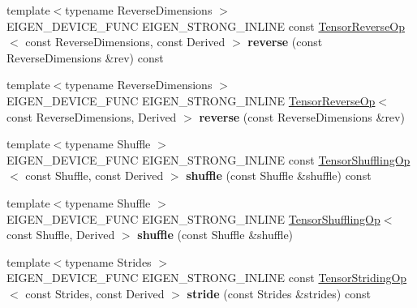 \begin{DoxyCompactItemize}
\item 
\mbox{\label{class_eigen_1_1_tensor_base_a5750e1b817c004898c1b54101c84e419}} 
{\footnotesize template$<$typename Reverse\+Dimensions $>$ }\\E\+I\+G\+E\+N\+\_\+\+D\+E\+V\+I\+C\+E\+\_\+\+F\+U\+NC E\+I\+G\+E\+N\+\_\+\+S\+T\+R\+O\+N\+G\+\_\+\+I\+N\+L\+I\+NE const \hyperlink{class_eigen_1_1_tensor_reverse_op}{Tensor\+Reverse\+Op}$<$ const Reverse\+Dimensions, const Derived $>$ {\bfseries reverse} (const Reverse\+Dimensions \&rev) const
\item 
\mbox{\label{class_eigen_1_1_tensor_base_af728216c82e1b396c5c1f22855733368}} 
{\footnotesize template$<$typename Reverse\+Dimensions $>$ }\\E\+I\+G\+E\+N\+\_\+\+D\+E\+V\+I\+C\+E\+\_\+\+F\+U\+NC E\+I\+G\+E\+N\+\_\+\+S\+T\+R\+O\+N\+G\+\_\+\+I\+N\+L\+I\+NE \hyperlink{class_eigen_1_1_tensor_reverse_op}{Tensor\+Reverse\+Op}$<$ const Reverse\+Dimensions, Derived $>$ {\bfseries reverse} (const Reverse\+Dimensions \&rev)
\item 
\mbox{\label{class_eigen_1_1_tensor_base_a8d6f38be695d3f72a6106463c10fc50e}} 
{\footnotesize template$<$typename Shuffle $>$ }\\E\+I\+G\+E\+N\+\_\+\+D\+E\+V\+I\+C\+E\+\_\+\+F\+U\+NC E\+I\+G\+E\+N\+\_\+\+S\+T\+R\+O\+N\+G\+\_\+\+I\+N\+L\+I\+NE const \hyperlink{class_eigen_1_1_tensor_shuffling_op}{Tensor\+Shuffling\+Op}$<$ const Shuffle, const Derived $>$ {\bfseries shuffle} (const Shuffle \&shuffle) const
\item 
\mbox{\label{class_eigen_1_1_tensor_base_aabecda1dcfdfd4d699f2fc174b7619a6}} 
{\footnotesize template$<$typename Shuffle $>$ }\\E\+I\+G\+E\+N\+\_\+\+D\+E\+V\+I\+C\+E\+\_\+\+F\+U\+NC E\+I\+G\+E\+N\+\_\+\+S\+T\+R\+O\+N\+G\+\_\+\+I\+N\+L\+I\+NE \hyperlink{class_eigen_1_1_tensor_shuffling_op}{Tensor\+Shuffling\+Op}$<$ const Shuffle, Derived $>$ {\bfseries shuffle} (const Shuffle \&shuffle)
\item 
\mbox{\label{class_eigen_1_1_tensor_base_ac0b491ea9d2608668526b7d31c904117}} 
{\footnotesize template$<$typename Strides $>$ }\\E\+I\+G\+E\+N\+\_\+\+D\+E\+V\+I\+C\+E\+\_\+\+F\+U\+NC E\+I\+G\+E\+N\+\_\+\+S\+T\+R\+O\+N\+G\+\_\+\+I\+N\+L\+I\+NE const \hyperlink{class_eigen_1_1_tensor_striding_op}{Tensor\+Striding\+Op}$<$ const Strides, const Derived $>$ {\bfseries stride} (const Strides \&strides) const

\end{DoxyCompactItemize}
